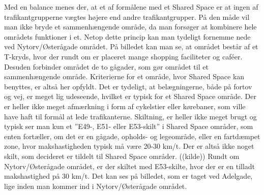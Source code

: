 Med en balance menes der, at et af formålene med et Shared Space er at ingen af trafikantgrupperne vægtes højere end andre trafikantgrupper. På den måde vil man ikke bryde et sammenhængende område, da man forsøger at kombinere hele områdets funktioner i et. Netop dette princip kan man tydeligt fornemme nede ved Nytorv/Østerågade området. På billedet kan man se, at området består af et T-kryds, hvor der rundt om er placeret mange shopping faciliteter og caféer. Desuden forbinder området de to gågader, som gør området til et sammenhængende område. Kriterierne for et område, hvor Shared Space kan benyttes, er altså her opfyldt. 
Det er tydeligt, at belægningerne, både på fortov og vej, er meget lig udeseende, hvilket er typisk for et Shared Space område. Der er heller ikke meget afmærkning i form af cykelstier eller kørebaner, som ville have haft til formål at lede trafikanterne. Skiltning, er heller ikke meget brugt og typisk ser man kun et ”E49-, E51- eller E53-skilt” i Shared Space områder, som enten fortæller, om det er en gågade, opholds- og legeområde, eller en fartdæmpet zone, hvor makshastigheden typisk må være 20-30 km/t. Der er altså ikke noget skilt, som decideret er tildelt til Shared Space områder. ((kilde)) Rundt om Nytorv/Østerågade området, er der skiltet med E53-skilte, hvor der er en tilladt makshastighed på 30 km/t. Det kan ses på billedet, som er taget ved Adelgade, lige inden man kommer ind i Nytorv/Østerågade området.

